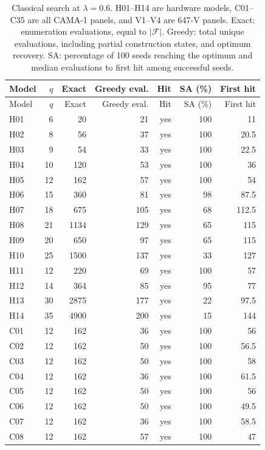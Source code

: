 \begingroup
\small
\setlength{\tabcolsep}{4pt}
\begin{longtable}{lrrrrrr}
\caption{Classical search at $\lambda=0.6$. H01--H14 are hardware models, C01--C35 are all CAMA-1 panels, and V1--V4 are 647-V panels. Exact: enumeration evaluations, equal to $|\mathcal F|$. Greedy: total unique evaluations, including partial construction states, and optimum recovery. SA: percentage of 100 seeds reaching the optimum and median evaluations to first hit among successful seeds.}\\
\toprule
Model & $q$ & Exact & Greedy eval. & Hit & SA (\%) & First hit\\
\midrule
\endfirsthead
\toprule
Model & $q$ & Exact & Greedy eval. & Hit & SA (\%) & First hit\\
\midrule
\endhead
H01 & 6 & 20 & 21 & yes & 100 & 11 \\
H02 & 8 & 56 & 37 & yes & 100 & 20.5 \\
H03 & 9 & 54 & 33 & yes & 100 & 22.5 \\
H04 & 10 & 120 & 53 & yes & 100 & 36 \\
H05 & 12 & 162 & 57 & yes & 100 & 54 \\
H06 & 15 & 360 & 81 & yes & 98 & 87.5 \\
H07 & 18 & 675 & 105 & yes & 68 & 112.5 \\
H08 & 21 & 1134 & 129 & yes & 65 & 115 \\
H09 & 20 & 650 & 97 & yes & 65 & 115 \\
H10 & 25 & 1500 & 137 & yes & 33 & 127 \\
H11 & 12 & 220 & 69 & yes & 100 & 57 \\
H12 & 14 & 364 & 85 & yes & 95 & 77 \\
H13 & 30 & 2875 & 177 & yes & 22 & 97.5 \\
H14 & 35 & 4900 & 200 & yes & 15 & 144 \\
C01 & 12 & 162 & 36 & yes & 100 & 56 \\
C02 & 12 & 162 & 50 & yes & 100 & 56.5 \\
C03 & 12 & 162 & 50 & yes & 100 & 58 \\
C04 & 12 & 162 & 36 & yes & 100 & 61.5 \\
C05 & 12 & 162 & 50 & yes & 100 & 56 \\
C06 & 12 & 162 & 50 & yes & 100 & 49.5 \\
C07 & 12 & 162 & 36 & yes & 100 & 58.5 \\
C08 & 12 & 162 & 57 & yes & 100 & 47 \\

\end{longtable}

